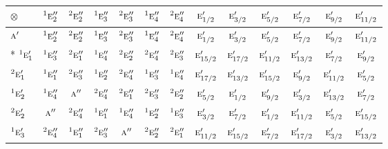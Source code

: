 \documentclass[10pt,a4paper]{article}
\numberwithin{equation}{section}
\newcommand{\irr}[1]{\text{\normalfont\scshape #1}}
\newcommand{\conjpair}[1]{{}^{#1}}
\newcommand{\irrprod}{\otimes}
\begin{document}
{\small\setlength{\tabcolsep}{3pt}\begin{longtable}{@{}lcccccccccccc@{}}\toprule
$\irrprod$ & $\conjpair{1}\irr{e}_{2}''$ & $\conjpair{2}\irr{e}_{2}''$ & $\conjpair{1}\irr{e}_{3}''$ & $\conjpair{2}\irr{e}_{3}''$ & $\conjpair{1}\irr{e}_{4}''$ & $\conjpair{2}\irr{e}_{4}''$ & $\irr{e}_{1/2}'$ & $\irr{e}_{3/2}'$ & $\irr{e}_{5/2}'$ & $\irr{e}_{7/2}'$ & $\irr{e}_{9/2}'$ & $\irr{e}_{11/2}'$\\\midrule\endhead
\bottomrule\endfoot\endlastfoot
$\irr{a}'$ & $\conjpair{1}\irr{e}_{2}''$ & $\conjpair{2}\irr{e}_{2}''$ & $\conjpair{1}\irr{e}_{3}''$ & $\conjpair{2}\irr{e}_{3}''$ & $\conjpair{1}\irr{e}_{4}''$ & $\conjpair{2}\irr{e}_{4}''$ & $\irr{e}_{1/2}'$ & $\irr{e}_{3/2}'$ & $\irr{e}_{5/2}'$ & $\irr{e}_{7/2}'$ & $\irr{e}_{9/2}'$ & $\irr{e}_{11/2}'$\\*
$\conjpair{1}\irr{e}_{1}'$ & $\conjpair{1}\irr{e}_{3}''$ & $\conjpair{2}\irr{e}_{1}''$ & $\conjpair{1}\irr{e}_{4}''$ & $\conjpair{2}\irr{e}_{2}''$ & $\conjpair{2}\irr{e}_{4}''$ & $\conjpair{2}\irr{e}_{3}''$ & $\irr{e}_{15/2}'$ & $\irr{e}_{17/2}'$ & $\irr{e}_{11/2}'$ & $\irr{e}_{13/2}'$ & $\irr{e}_{7/2}'$ & $\irr{e}_{9/2}'$\\
$\conjpair{2}\irr{e}_{1}'$ & $\conjpair{1}\irr{e}_{1}''$ & $\conjpair{2}\irr{e}_{3}''$ & $\conjpair{1}\irr{e}_{2}''$ & $\conjpair{2}\irr{e}_{4}''$ & $\conjpair{1}\irr{e}_{3}''$ & $\conjpair{1}\irr{e}_{4}''$ & $\irr{e}_{17/2}'$ & $\irr{e}_{13/2}'$ & $\irr{e}_{15/2}'$ & $\irr{e}_{9/2}'$ & $\irr{e}_{11/2}'$ & $\irr{e}_{5/2}'$\\
$\conjpair{1}\irr{e}_{2}'$ & $\conjpair{1}\irr{e}_{4}''$ & $\irr{a}''$ & $\conjpair{2}\irr{e}_{4}''$ & $\conjpair{2}\irr{e}_{1}''$ & $\conjpair{2}\irr{e}_{3}''$ & $\conjpair{2}\irr{e}_{2}''$ & $\irr{e}_{5/2}'$ & $\irr{e}_{1/2}'$ & $\irr{e}_{9/2}'$ & $\irr{e}_{3/2}'$ & $\irr{e}_{13/2}'$ & $\irr{e}_{7/2}'$\\
$\conjpair{2}\irr{e}_{2}'$ & $\irr{a}''$ & $\conjpair{2}\irr{e}_{4}''$ & $\conjpair{1}\irr{e}_{1}''$ & $\conjpair{1}\irr{e}_{4}''$ & $\conjpair{1}\irr{e}_{2}''$ & $\conjpair{1}\irr{e}_{3}''$ & $\irr{e}_{3/2}'$ & $\irr{e}_{7/2}'$ & $\irr{e}_{1/2}'$ & $\irr{e}_{11/2}'$ & $\irr{e}_{5/2}'$ & $\irr{e}_{15/2}'$\\
$\conjpair{1}\irr{e}_{3}'$ & $\conjpair{2}\irr{e}_{4}''$ & $\conjpair{1}\irr{e}_{1}''$ & $\conjpair{2}\irr{e}_{3}''$ & $\irr{a}''$ & $\conjpair{2}\irr{e}_{2}''$ & $\conjpair{2}\irr{e}_{1}''$ & $\irr{e}_{11/2}'$ & $\irr{e}_{15/2}'$ & $\irr{e}_{7/2}'$ & $\irr{e}_{17/2}'$ & $\irr{e}_{3/2}'$ & $\irr{e}_{13/2}'$\\

\end{longtable}}
\end{document}
